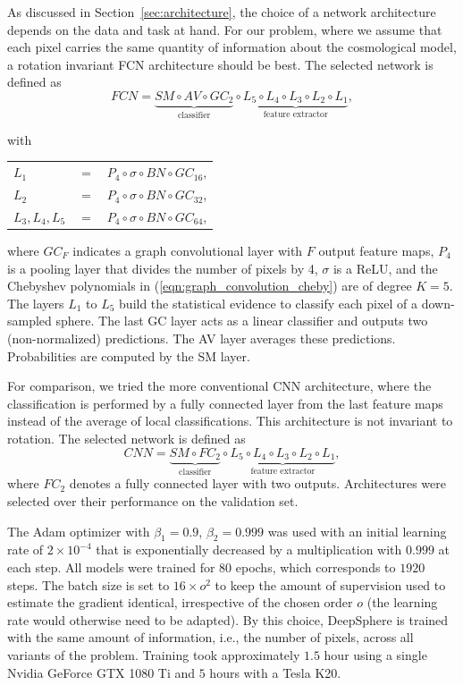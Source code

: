 \documentclass[final,twocolumn,3p,times,sort&compress]{elsarticle}
\newcommand{\secref}[1]{Section~\ref{sec:#1}}
\newcommand{\eqnref}[1]{(\ref{eqn:#1})}
\newcommand{\1}{\b{1}}              %
\newcommand{\0}{\b{0}}              %
\begin{document}
As discussed in \secref{architecture}, the choice of a network architecture depends on the data and task at hand.
For our problem, where we assume that each pixel carries the same quantity of information about the cosmological model, a rotation invariant FCN architecture should be best.
The selected network is defined as
\begin{equation*}
	FCN = \underbrace{SM \circ AV \circ GC_2}_{\text{classifier}} \circ \underbrace{L_5 \circ L_4 \circ L_3 \circ L_2 \circ L_1}_{\text{feature extractor}},
\end{equation*}
\begin{center}
with \hspace{0.5cm} \begin{tabular}{lll}
   $L_1$ &  $=$ &$ P_4 \circ \sigma \circ BN \circ GC_{16}$, \\
   $L_2$ &  $=$ &$ P_4 \circ \sigma \circ BN \circ GC_{32}$, \\
   $L_3,L_4,L_5$ & $=$ &$ P_4 \circ \sigma \circ BN \circ GC_{64}$, \\
\end{tabular}
\end{center}
where $GC_F$ indicates a graph convolutional layer with $F$ output feature maps, $P_4$ is a pooling layer that divides the number of pixels by 4, $\sigma$ is a ReLU, and the Chebyshev polynomials in \eqnref{graph_convolution_cheby} are of degree $K=5$.
The layers $L_1$ to $L_5$ build the statistical evidence to classify each pixel of a down-sampled sphere. The last GC layer acts as a linear classifier and outputs two (non-normalized) predictions. The AV layer averages these predictions. Probabilities are computed by the SM layer.

For comparison, we tried the more conventional CNN architecture, where the classification is performed by a fully connected layer from the last feature maps instead of the average of local classifications. This architecture is not invariant to rotation. The selected network is defined as
\begin{equation*}
	CNN = \underbrace{SM \circ FC_2}_{\text{classifier}} \circ \underbrace{L_5 \circ L_4 \circ L_3 \circ L_2 \circ L_1}_{\text{feature extractor}},
\end{equation*}
where $FC_2$ denotes a fully connected layer with two outputs.
Architectures were selected over their performance on the validation set.

The Adam optimizer \citep{kingma2014adam} with $\beta_1=0.9$, $\beta_2=0.999$ was used with an initial learning rate of $2 \times 10^{-4}$ that is exponentially decreased by a multiplication with $0.999$ at each step.
All models were trained for $80$ epochs, which corresponds to $1920$ steps. The batch size is set to $16 \times  o^2$ to keep the amount of supervision used to estimate the gradient identical, irrespective of the chosen order $o$ (the learning rate would otherwise need to be adapted). By this choice, DeepSphere is trained with the same amount of information, i.e., the number of pixels, across all variants of the problem.
Training took approximately $1.5$ hour using a single Nvidia GeForce GTX 1080 Ti and $5$ hours with a Tesla K20.
\end{document}
